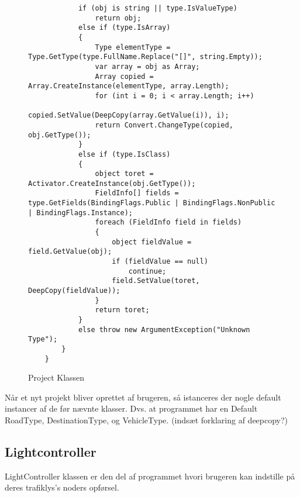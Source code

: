 \begin{figure}[H]
\begin{lstlisting}
            if (obj is string || type.IsValueType)
                return obj;
            else if (type.IsArray)
            {
                Type elementType = Type.GetType(type.FullName.Replace("[]", string.Empty));
                var array = obj as Array;
                Array copied = Array.CreateInstance(elementType, array.Length);
                for (int i = 0; i < array.Length; i++)
                    copied.SetValue(DeepCopy(array.GetValue(i)), i);
                return Convert.ChangeType(copied, obj.GetType());
            }
            else if (type.IsClass)
            {
                object toret = Activator.CreateInstance(obj.GetType());
                FieldInfo[] fields = type.GetFields(BindingFlags.Public | BindingFlags.NonPublic | BindingFlags.Instance);
                foreach (FieldInfo field in fields)
                {
                    object fieldValue = field.GetValue(obj);
                    if (fieldValue == null)
                        continue;
                    field.SetValue(toret, DeepCopy(fieldValue));
                }
                return toret;
            }
            else throw new ArgumentException("Unknown Type");
        }
    }
\end{lstlisting}
\caption{Project Klassen}\label{projectClass}
\end{figure}
Når et nyt projekt bliver oprettet af brugeren, så istanceres der nogle default instancer af de før nævnte klasser. Dvs. at programmet har en Default RoadType, DestinationType, og VehicleType.
(indsæt forklaring af deepcopy?)

\subsection{Lightcontroller}
LightController klassen er den del af programmet hvori brugeren kan indstille på deres trafiklys's noders opførsel.

